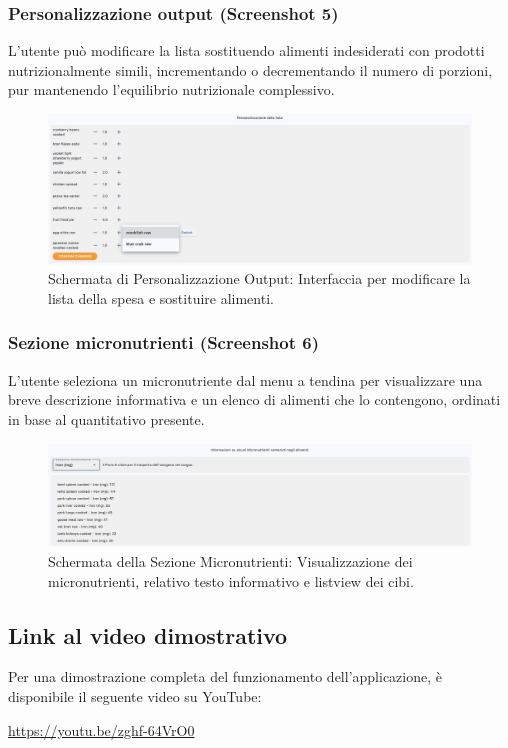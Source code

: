 \documentclass[11pt,a4paper]{article}
\begin{document}
\subsubsection{Personalizzazione output (Screenshot 5)}
L’utente può modificare la lista sostituendo alimenti indesiderati con prodotti nutrizionalmente simili, incrementando o decrementando il numero di porzioni, pur mantenendo l’equilibrio nutrizionale complessivo.

\begin{figure}[h!]
    \centering
    \includegraphics[width=1\textwidth]{personalizzazione_output.png}
    \caption{Schermata di Personalizzazione Output: Interfaccia per modificare la lista della spesa e sostituire alimenti.}
    \label{fig:personalizzazione_output}
\end{figure}

\subsubsection{Sezione micronutrienti (Screenshot 6)}
L’utente seleziona un micronutriente dal menu a tendina per visualizzare una breve descrizione informativa e un elenco di alimenti che lo contengono, ordinati in base al quantitativo presente.

\begin{figure}[h!]
    \centering
    \includegraphics[width=1\textwidth]{sezione_micronutrienti.png}
    \caption{Schermata della Sezione Micronutrienti: Visualizzazione dei micronutrienti, relativo testo informativo e listview dei cibi.}
    \label{fig:sezione_micronutrienti}
\end{figure}

\subsection{Link al video dimostrativo}
Per una dimostrazione completa del funzionamento dell’applicazione, è disponibile il seguente video su YouTube:
\begin{center}
\url{https://youtu.be/zghf-64VrO0}
\end{center}
\end{document}

